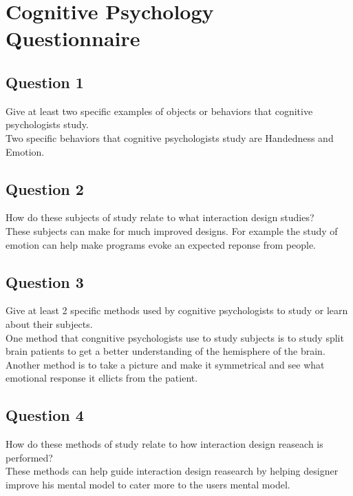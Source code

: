 \documentclass[a4paper]{article}
\begin{document}
\section{Cognitive Psychology Questionnaire}

\subsection{Question 1}
Give at least two specific examples of objects or behaviors that cognitive psychologists study.\\

Two specific behaviors that cognitive psychologists study are Handedness and Emotion.

\subsection{Question 2}
How do these subjects of study relate to what interaction design studies?\\

These subjects can make for much improved designs. For example the study of emotion can help make programs evoke an expected reponse from people.

\subsection{Question 3}
Give at least 2 specific methods used by cognitive psychologists to study or learn about their subjects.\\

One method that congnitive psychologists use to study subjects is to study split brain patients to get a better understanding of the hemisphere of the brain. Another method is to take a picture and make it symmetrical and see what emotional response it ellicts from the patient.  

\subsection{Question 4}
How do these methods of study relate to how interaction design reaseach is performed?\\

These methods can help guide interaction design reasearch by helping designer improve his mental model to cater more to the users mental model.
\end{document}
